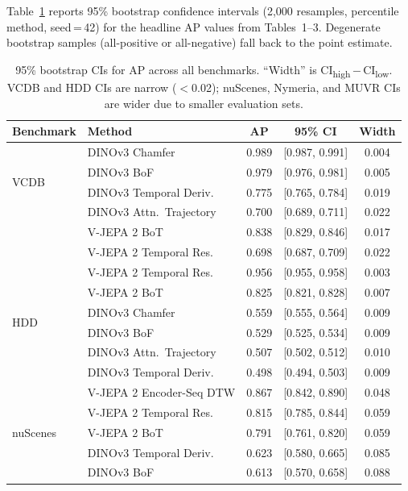 \documentclass{article}
\theoremstyle{remark}
\begin{document}
Table~\ref{tab:bootstrap} reports 95\% bootstrap confidence intervals (2{,}000 resamples, percentile method, seed\,=\,42) for the headline AP values from Tables~1--3. Degenerate bootstrap samples (all-positive or all-negative) fall back to the point estimate.

\begin{table}[h]
\centering
\caption{95\% bootstrap CIs for AP across all benchmarks. ``Width'' is CI\textsubscript{high}\,$-$\,CI\textsubscript{low}. VCDB and HDD CIs are narrow ($<$0.02); nuScenes, Nymeria, and MUVR CIs are wider due to smaller evaluation sets.}
\label{tab:bootstrap}
\begin{tabular}{llccc}
\toprule
\textbf{Benchmark} & \textbf{Method} & \textbf{AP} & \textbf{95\% CI} & \textbf{Width} \\
\midrule
\multirow{4}{*}{VCDB}
 & DINOv3 Chamfer           & 0.989 & [0.987, 0.991] & 0.004 \\
 & DINOv3 BoF               & 0.979 & [0.976, 0.981] & 0.005 \\
 & DINOv3 Temporal Deriv.   & 0.775 & [0.765, 0.784] & 0.019 \\
 & DINOv3 Attn.\ Trajectory & 0.700 & [0.689, 0.711] & 0.022 \\
 & V-JEPA 2 BoT             & 0.838 & [0.829, 0.846] & 0.017 \\
 & V-JEPA 2 Temporal Res.   & 0.698 & [0.687, 0.709] & 0.022 \\
\midrule
\multirow{6}{*}{HDD}
 & V-JEPA 2 Temporal Res.   & 0.956 & [0.955, 0.958] & 0.003 \\
 & V-JEPA 2 BoT             & 0.825 & [0.821, 0.828] & 0.007 \\
 & DINOv3 Chamfer           & 0.559 & [0.555, 0.564] & 0.009 \\
 & DINOv3 BoF               & 0.529 & [0.525, 0.534] & 0.009 \\
 & DINOv3 Attn.\ Trajectory & 0.507 & [0.502, 0.512] & 0.010 \\
 & DINOv3 Temporal Deriv.   & 0.498 & [0.494, 0.503] & 0.009 \\
\midrule
\multirow{7}{*}{nuScenes}
 & V-JEPA 2 Encoder-Seq DTW & 0.867 & [0.842, 0.890] & 0.048 \\
 & V-JEPA 2 Temporal Res.   & 0.815 & [0.785, 0.844] & 0.059 \\
 & V-JEPA 2 BoT             & 0.791 & [0.761, 0.820] & 0.059 \\
 & DINOv3 Temporal Deriv.   & 0.623 & [0.580, 0.665] & 0.085 \\
 & DINOv3 BoF               & 0.613 & [0.570, 0.658] & 0.088 \\

\end{tabular}
\end{table}
\end{document}
